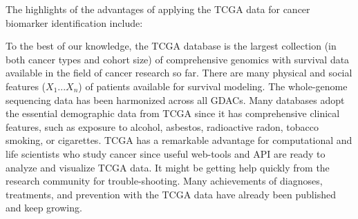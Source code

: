\documentclass[jpm,article,submit,moreauthors,pdftex]{Definitions/mdpi}
\begin{document}

The highlights of the advantages of applying the TCGA data for cancer biomarker identification include:
\begin{outline}
\1  To the best of our knowledge, the TCGA database is the largest collection (in both cancer types and cohort size) of comprehensive genomics with survival data available in the field of cancer research so far.  
There are many physical and social features ($X_1 ... X_n$) of patients available for survival modeling.
The whole-genome sequencing data has been harmonized across all GDACs.  Many databases adopt the essential demographic data from TCGA since it has comprehensive clinical features, such as exposure to alcohol, asbestos, radioactive radon, tobacco smoking, or cigarettes.
\1  TCGA has a remarkable advantage for computational and life scientists who study cancer since useful web-tools and API are ready to analyze and visualize TCGA data. It might be getting help quickly from the research community for trouble-shooting.
\1  Many achievements of diagnoses, treatments, and prevention with the TCGA data have already been published and keep growing.\cite{Tomczak2015}
\end{outline}
\end{document}
